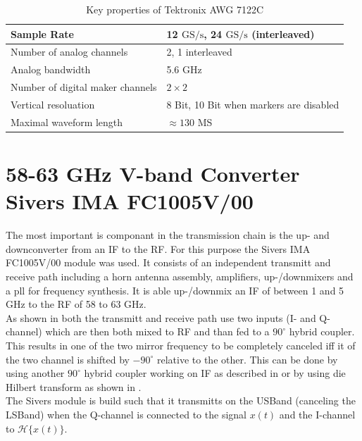 \begin{table}[h]
  \centering
  \begin{tabular}{|l|l|}
    \hline
    Sample Rate & 12 $\text{GS}/\text{s}$, 24 $\text{GS}/\text{s}$ (interleaved) \\ \hline
    Number of analog channels & 2, 1 interleaved \\ \hline
    Analog bandwidth & 5.6 GHz \\ \hline
    Number of digital maker channels & $2 \times 2$ \\ \hline
    Vertical resoluation & 8 Bit, 10 Bit when markers are disabled \\ \hline
    Maximal waveform length & $\approx 130$ MS  \\ \hline
  \end{tabular}
  \caption{Key properties of Tektronix AWG 7122C}
  \label{tab:awg}
\end{table}

\section{58-63 GHz V-band Converter Sivers IMA FC1005V/00}
The most important is componant in the transmission chain is the
up- and downconverter from an \acrfull{IF} to the \acrfull{RF}.
For this purpose the Sivers IMA FC1005V/00 module was used.
It consists of an independent transmitt and receive path including
a horn antenna assembly, amplifiers, up-/downmixers and a pll
for frequency synthesis. It is able up-/downmix an \gls{IF}
of between 1 and 5 GHz to the \gls{RF} of 58 to 63 GHz. \\

As shown in  both the transmitt and receive path
use two inputs (I- and Q-channel) which are then both mixed to
\gls{RF} and than fed to a $90^\circ$ hybrid coupler. \\
This results in one of the two mirror frequency to be completely canceled
iff it of the two channel is shifted by $-90^\circ$ relative to the other.
This can be done by using another $90^\circ$ hybrid coupler working on
\gls{IF} as described in  or by using die Hilbert
transform as shown in . \\
The Sivers module is build such that it transmitts on the \gls{USBand}
(canceling the \gls{LSBand}) when the Q-channel is connected to the signal
$x(t)$ and the I-channel to $\mathcal{H}\{x(t)\}$.
 \\

